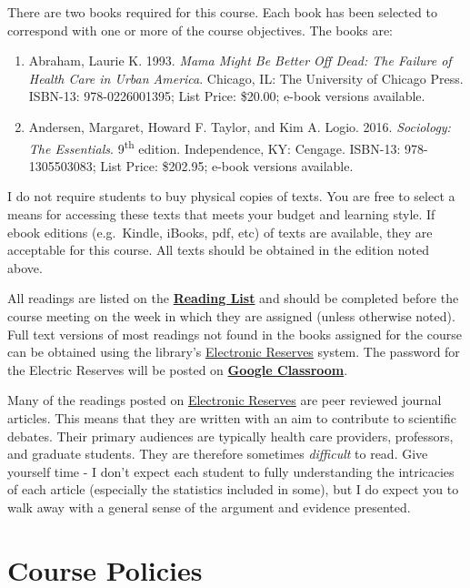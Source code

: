 \documentclass[]{book}
\begin{document}
There are two books required for this course. Each book has been selected to correspond with one or more of the course objectives. The books are:

\begin{enumerate}
\def\labelenumi{\arabic{enumi}.}
\item
  Abraham, Laurie K. 1993. \emph{Mama Might Be Better Off Dead: The Failure of Health Care in Urban America}. Chicago, IL: The University of Chicago Press. ISBN-13: 978-0226001395; List Price: \$20.00; e-book versions available.
\item
  Andersen, Margaret, Howard F. Taylor, and Kim A. Logio. 2016. \emph{Sociology: The Essentials}. 9\textsuperscript{th} edition. Independence, KY: Cengage. ISBN-13: 978-1305503083; List Price: \$202.95; e-book versions available.
\end{enumerate}

I do not require students to buy physical copies of texts. You are free to select a means for accessing these texts that meets your budget and learning style. If ebook editions (e.g.~Kindle, iBooks, pdf, etc) of texts are available, they are acceptable for this course. All texts should be obtained in the edition noted above.

All readings are listed on the \href{/lecture-schedule.html}{\textbf{Reading List}} and should be completed before the course meeting on the week in which they are assigned (unless otherwise noted). Full text versions of most readings not found in the books assigned for the course can be obtained using the library's \href{http://eres.slu.edu/eres/coursepass.aspx?cid=4443}{Electronic Reserves} system. The password for the Electric Reserves will be posted on \textbf{\href{https://classroom.google.com}{Google Classroom}}.

Many of the readings posted on \href{http://eres.slu.edu/eres/coursepass.aspx?cid=4443}{Electronic Reserves} are peer reviewed journal articles. This means that they are written with an aim to contribute to scientific debates. Their primary audiences are typically health care providers, professors, and graduate students. They are therefore sometimes \emph{difficult} to read. Give yourself time - I don't expect each student to fully understanding the intricacies of each article (especially the statistics included in some), but I do expect you to walk away with a general sense of the argument and evidence presented.

\hypertarget{course-policies}{%
\chapter{Course Policies}\label{course-policies}}
\end{document}
